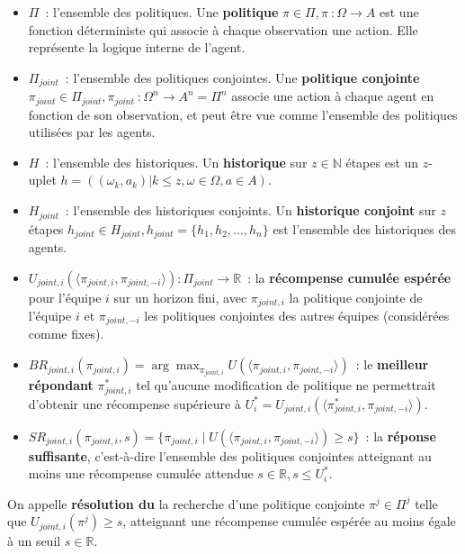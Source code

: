 \begin{itemize}
  \item $\Pi$~: l'ensemble des politiques. Une \textbf{politique} $\pi \in \Pi, \pi~: \Omega \rightarrow A$ est une fonction déterministe qui associe à chaque observation une action. Elle représente la logique interne de l'agent.
  \item $\Pi_{joint}$~: l'ensemble des politiques conjointes. Une \textbf{politique conjointe} $\pi_{joint} \in \Pi_{joint}, \pi_{joint}~: \Omega^n \rightarrow A^n = \Pi^n$ associe une action à chaque agent en fonction de son observation, et peut être vue comme l'ensemble des politiques utilisées par les agents.
  \item $H$~: l'ensemble des historiques. Un \textbf{historique} sur $z \in \mathbb{N}$ étapes est un $z$-uplet $h = ((\omega_k, a_k) | k \leq z, \omega \in \Omega, a \in A)$.
  \item $H_{joint}$~: l'ensemble des historiques conjoints. Un \textbf{historique conjoint} sur $z$ étapes $h_{joint} \in H_{joint}, h_{joint} = \{h_1, h_2, ..., h_n\}$ est l'ensemble des historiques des agents.
  \item $U_{joint,i}(\langle \pi_{joint,i}, \pi_{joint,-i} \rangle): \Pi_{joint} \rightarrow \mathbb{R}$~: la \textbf{récompense cumulée espérée} pour l'équipe $i$ sur un horizon fini, avec $\pi_{joint,i}$ la politique conjointe de l'équipe $i$ et $\pi_{joint,-i}$ les politiques conjointes des autres équipes (considérées comme fixes).
  \item $BR_{joint,i}(\pi_{joint,i}) = \arg\max_{\pi_{joint,i}} U(\langle \pi_{joint,i}, \pi_{joint,-i} \rangle)$~: le \textbf{meilleur répondant} $\pi^*_{joint,i}$ tel qu'aucune modification de politique ne permettrait d'obtenir une récompense supérieure à $U^*_i = U_{joint,i}(\langle \pi^*_{joint,i}, \pi_{joint,-i} \rangle)$.
  \item $SR_{joint,i}(\pi_{joint,i}, s) = \{\pi_{joint,i} \mid U(\langle \pi_{joint,i}, \pi_{joint,-i} \rangle) \geq s\}$~: la \textbf{réponse suffisante}, c'est-à-dire l'ensemble des politiques conjointes atteignant au moins une récompense cumulée attendue $s \in \mathbb{R}, s \leq U^*_i$.
\end{itemize}

On appelle \textbf{résolution du } la recherche d'une politique conjointe $\pi^j \in \Pi^j$ telle que $U_{joint,i}(\pi^j) \geq s$, atteignant une récompense cumulée espérée au moins égale à un seuil $s \in \mathbb{R}$.



